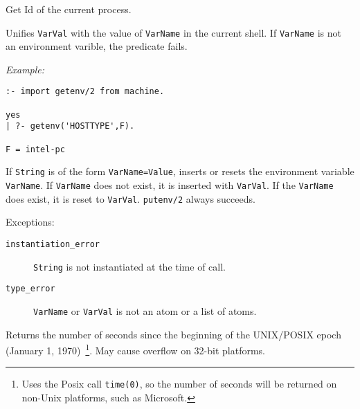 \begin{description}
Get Id of the current process.

%
Unifies {\tt VarVal} with the value of {\tt VarName} in the current
shell.  If {\tt VarName} is not an environment varible, the predicate
fails.

{\em Example:}
\begin{verbatim}
:- import getenv/2 from machine.

yes
| ?- getenv('HOSTTYPE',F).

F = intel-pc
\end{verbatim}

%
If {\tt String} is of the form {\tt VarName=Value}, inserts or resets
the environment variable {\tt VarName}.  If {\tt VarName} does not
exist, it is inserted with {\tt VarVal}.  If the {\tt VarName} does
exist, it is reset to {\tt VarVal}.  {\tt putenv/2} always succeeds.

Exceptions:
    \begin{description}
    \item[{\tt instantiation\_error}] {\tt String} is
      not instantiated at the time of call.
    \item[{\tt type\_error}]
        {\tt VarName} or {\tt VarVal} is not an atom or a list of atoms.
    \end{description}

%
Returns the number of seconds since the beginning of the UNIX/POSIX
epoch (January 1, 1970)~\footnote{Uses the Posix call {\tt time(0)},
  so the number of seconds will be returned on non-Unix platforms,
  such as Microsoft.}.  May cause overflow on 32-bit platforms.

\end{description}

